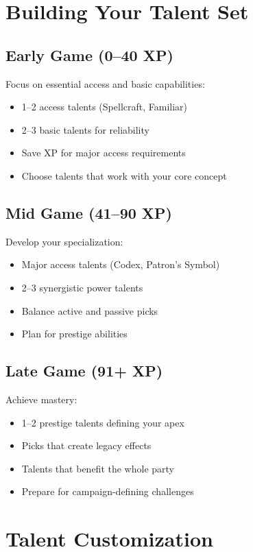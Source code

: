 \documentclass[11pt,twoside,openany]{book}
\begin{document}
\section*{Building Your Talent Set} 

\subsection*{Early Game (0--40 XP)}

Focus on essential access and basic capabilities:
\begin{itemize}
\item 1--2 access talents (Spellcraft, Familiar)
\item 2--3 basic talents for reliability
\item Save XP for major access requirements
\item Choose talents that work with your core concept
\end{itemize}

\subsection*{Mid Game (41--90 XP)}

Develop your specialization:
\begin{itemize}
\item Major access talents (Codex, Patron's Symbol)
\item 2--3 synergistic power talents
\item Balance active and passive picks
\item Plan for prestige abilities
\end{itemize}

\subsection*{Late Game (91+ XP)}

Achieve mastery:
\begin{itemize}
\item 1--2 prestige talents defining your apex
\item Picks that create legacy effects
\item Talents that benefit the whole party
\item Prepare for campaign-defining challenges
\end{itemize}

\section*{Talent Customization} 
\end{document}
